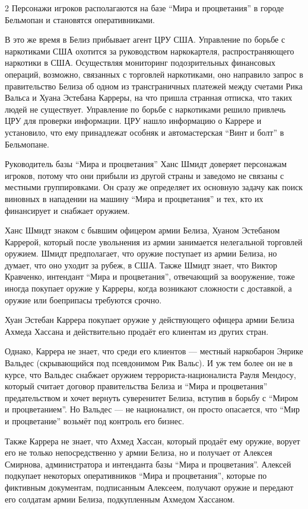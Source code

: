 \documentclass[twoside]{article}
\begin{document}
\begin{multicols}{2}
Персонажи игроков располагаются на базе \enquote{Мира и процветания} в городе
Бельмопан и становятся оперативниками.

В это же время в Белиз прибывает агент ЦРУ США. Управление по борьбе с
наркотиками США охотится за руководством наркокартеля, распространяющего
наркотики в США. Осуществляя мониторинг подозрительных финансовых
операций, возможно, связанных с торговлей наркотиками, оно направило
запрос в правительство Белиза об одном из трансграничных платежей между
счетами Рика Вальса и Хуана Эстебана Карреры, на что пришла странная
отписка, что таких людей не существует. Управление по борьбе с
наркотиками решило привлечь ЦРУ для проверки информации. ЦРУ нашло
информацию о Каррере и установило, что ему принадлежат особняк и
автомастерская \enquote{Винт и болт} в Бельмопане.

Руководитель базы \enquote{Мира и процветания} Ханс Шмидт доверяет персонажам
игроков, потому что они прибыли из другой страны и заведомо не связаны с
местными группировками. Он сразу же определяет их основную задачу как
поиск виновных в нападении на машину \enquote{Мира и процветания} и тех, кто их
финансирует и снабжает оружием.

Ханс Шмидт знаком с бывшим офицером армии Белиза, Хуаном Эстебаном
Каррерой, который после увольнения из армии занимается нелегальной
торговлей оружием. Шмидт предполагает, что оружие поступает из армии
Белиза, но думает, что оно уходит за рубеж, в США. Также Шмидт знает,
что Виктор Кравченко, интендант \enquote{Мира и процветания}, отвечающий за
вооружение, тоже иногда покупает оружие у Карреры, когда возникают
сложности с доставкой, а оружие или боеприпасы требуются срочно.

Хуан Эстебан Каррера покупает оружие у действующего офицера армии Белиза
Ахмеда Хассана и действительно продаёт его клиентам из других стран.

Однако, Каррера не знает, что среди его клиентов --- местный наркобарон
Энрике Вальдес (скрывающийся под псевдонимом Рик Вальс). И уж тем более
он не в курсе, что Вальдес снабжает оружием террориста-националиста
Рауля Мендосу, который считает договор правительства Белиза и \enquote{Мира и
процветания} предательством и хочет вернуть суверенитет Белиза, вступив
в борьбу с \enquote{Миром и процветанием}. Но Вальдес --- не националист, он
просто опасается, что \enquote{Мир и процветание} возьмёт под контроль его
бизнес.

Также Каррера не знает, что Ахмед Хассан, который продаёт ему оружие,
ворует его не только непосредственно у армии Белиза, но и получает от
Алексея Смирнова, администратора и интенданта базы \enquote{Мира и процветания}.
Алексей подкупает некоторых оперативников \enquote{Мира и процветания}, которые
по фиктивным документам, подписанным Алексеем, получают оружие и
передают его солдатам армии Белиза, подкупленным Ахмедом Хассаном.


\end{multicols}
\end{document}
